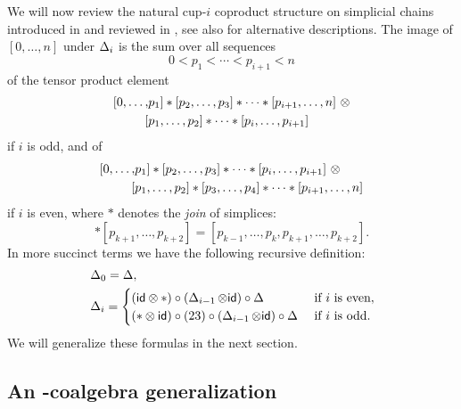 We will now review the natural cup-$i$ coproduct structure on simplicial chains introduced in \cite[p.293]{steenrod1947products} and reviewed in \cite[p.682]{mcclure2003multivariable}, see also  \cite{gonzalez-diaz1999steenrod, medina2021newformulas} for alternative descriptions.
The image of $[0, \dots, n]$ under $\operatorname{\Delta}_i$ is the sum over all sequences
\begin{equation*}
0 < p_1 < \cdots < p_{i+1} < n
\end{equation*}
of the tensor product element
\begin{equation*}
\begin{split}
[ 0, \dots, &{p_1} ] \ast [ {p_2}, \dots, {p_3} ] \ast \cdots \ast [ {p_{i+1}}, \dots, n ]\ \otimes \\
[ &{p_1}, \dots, {p_2} ] \ast \cdots \ast [ {p_{i}}, \dots, {p_{i+1}} ]
\end{split}
\end{equation*}
if $i$ is odd, and of
\begin{equation*}
\begin{split}
[ 0, \dots, &{p_1} ] \ast [ {p_2}, \dots, {p_3} ] \ast \cdots \ast [ {p_{i}}, \dots, {p_{i+1}} ]\ \otimes \\
[ &{p_1}, \dots, {p_2} ] \ast [ {p_3}, \dots, {p_4} ] \ast \cdots \ast [ {p_{i+1}}, \dots, n ]
\end{split}
\end{equation*}
if $i$ is even, where $\ast$ denotes the \textit{join} of simplices:
\begin{equation*}
[{p_{k-1}}, \dots, {p_{k}} ] \ast [ {p_{k+1}}, \dots, p_{k+2}] = [{p_{k-1}}, \dots, p_k, p_{k+1}, \dots, p_{k+2}].
\end{equation*}
In more succinct terms we have the following recursive definition:
\begin{align*}
& \operatorname{\Delta}_0 = \operatorname{\Delta}, \\
& \operatorname{\Delta}_i = \begin{cases}
(\mathsf{id} \otimes \ast) \circ (\operatorname{\Delta}_{i-1} \otimes \mathsf{id}) \circ \operatorname{\Delta} & \text{ if } i \text{ is even}, \\
(\ast \otimes \mathsf{id}) \circ (23) \circ (\operatorname{\Delta}_{i-1} \otimes \mathsf{id}) \circ \operatorname{\Delta} & \text{ if } i \text{ is odd}.
\end{cases}
\end{align*}
We will generalize these formulas in the next section.

\subsection{An \pdfEinfty-coalgebra generalization} \label{ss:e-infty generalization}

